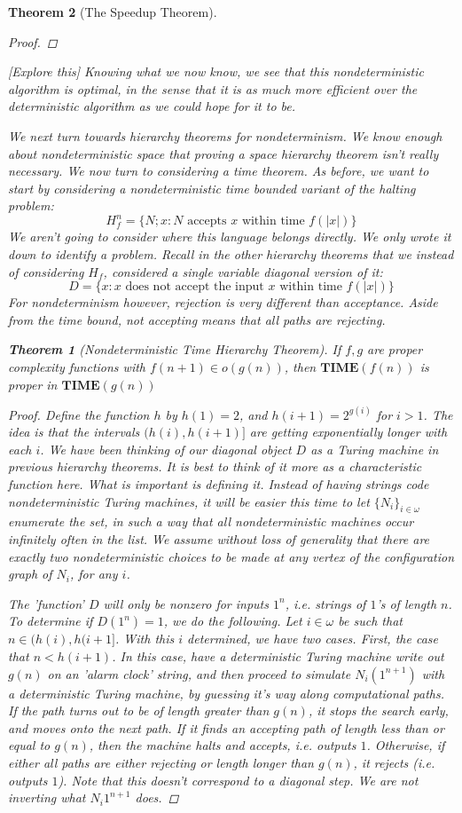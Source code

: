 \documentclass{article}
\theoremstyle{definition}
\theoremstyle{plain}
\theoremstyle{theorem}
\newtheorem{theorem}{Theorem}[section]
\begin{document}
\begin{theorem}[The Speedup Theorem]
\begin{proof}
\end{proof}
[Explore this] Knowing what we now know, we see that this nondeterministic algorithm is optimal, in the sense that it is as much more efficient over the deterministic algorithm as we could hope for it to be.
\par We next turn towards hierarchy theorems for nondeterminism. We know enough about nondeterministic space that proving a space hierarchy theorem isn't really necessary. We now turn to considering a time theorem. As before, we want to start by considering a nondeterministic time bounded variant of the halting problem:
\[ H^n_f = \{N;x: \textrm{$N$ accepts $x$ within time $f(|x|)$} \} \]
We aren't going to consider where this language belongs directly. We only wrote it down to identify a problem. Recall in the other hierarchy theorems that we instead of considering $H_f$, considered a single variable diagonal version of it:
\[ D = \{x: \textrm{$x$ does not accept the input $x$ within time $f(|x|)$}\} \]
For nondeterminism however, rejection is very different than acceptance. Aside from the time bound, not accepting means that \textit{all paths are rejecting}.
\begin{theorem}[Nondeterministic Time Hierarchy Theorem]
	If $f,g$ are proper complexity functions with $f(n+1) \in o(g(n))$, then $\textbf{TIME}(f(n))$ is proper in $\textbf{TIME}(g(n))$
\end{theorem}
\begin{proof}
	Define the function $h$ by $h(1)=2$, and $h(i+1) = 2^{g(i)}$ for $i > 1$. The idea is that the intervals $(h(i),h(i+1)]$ are getting exponentially longer with each $i$. We have been thinking of our diagonal object $D$ as a Turing machine in previous hierarchy theorems. It is best to think of it more as a characteristic function here. What is important is defining it. Instead of having strings code nondeterministic Turing machines, it will be easier this time to let $\{N_i\}_{i \in \omega}$ enumerate the set, in such a way that all nondeterministic machines occur infinitely often in the list. We assume without loss of generality that there are exactly two nondeterministic choices to be made at any vertex of the configuration graph of $N_i$, for any $i$.
	\par The 'function' $D$ will only be nonzero for inputs $1^n$, i.e. strings of $1$'s of length $n$. To determine if $D(1^n)=1$, we do the following. Let $i \in \omega$ be such that $n \in (h(i),h(i+1]$. With this $i$ determined, we have two cases. First, the case that $n < h(i+1)$. In this case, have a deterministic Turing machine write out $g(n)$ on an 'alarm clock' string, and then proceed to simulate $N_i(1^{n+1})$ with a deterministic Turing machine, by guessing it's way along computational paths. If the path turns out to be of length greater than $g(n)$, it stops the search early, and moves onto the next path. If it finds an accepting path of length less than or equal to $g(n)$, then the machine halts and accepts, i.e. outputs $1$. Otherwise, if either all paths are either rejecting or length longer than $g(n)$, it rejects (i.e. outputs $1$). Note that this \textit{doesn't correspond to a diagonal step. We are not inverting what $N_i{1^{n+1}}$ does.}

\end{proof}
\end{theorem}
\end{document}
